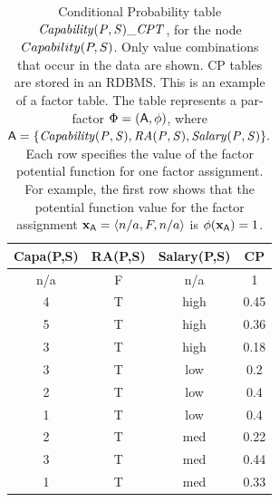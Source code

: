 \begin{table}[htbp]
  \centering
  \caption{ Conditional Probability table $\it{Capability}(\P,\S)\_\cptable$, for the node $Capability(\P,\S)$. Only value combinations that occur in the data are shown. CP tables are stored in an RDBMS. This is an example of a factor table.   The table represents a par-factor  $\parfactor = (\parrvs,\potential)$, where $\parrvs = \{\it{Capability}(\P,\S),\it{RA}(\P,\S),\it{Salary}(\P,\S)\}.$ Each row specifies the value of the factor potential function for one factor assignment. For example, the first row shows that the potential function value for the factor assignment $\set{x}_{\parrvs} = \langle n/a, F, n/a \rangle$ is $\potential(\set{x}_{\parrvs}) = 1$. }
    \begin{tabular}{|c|c|c|c|} \hline
    \textbf{Capa(P,S)} & \textbf{RA(P,S)} & \textbf{Salary(P,S)} & \textbf{CP} \\ \hline
    n/a   & F     & n/a   & 1 \\ \hline
    4     & T     & high  & 0.45 \\ \hline
    5     & T     & high  & 0.36 \\ \hline
    3     & T     & high  & 0.18 \\ \hline
    3     & T     & low   & 0.2 \\ \hline
    2     & T     & low   & 0.4 \\ \hline
    1     & T     & low   & 0.4 \\ \hline
    2     & T     & med   & 0.22 \\ \hline
    3     & T     & med   & 0.44 \\ \hline
    1     & T     & med   & 0.33 \\ \hline
    \end{tabular}%
  \label{tab:pbn-cp}%
\end{table}%

